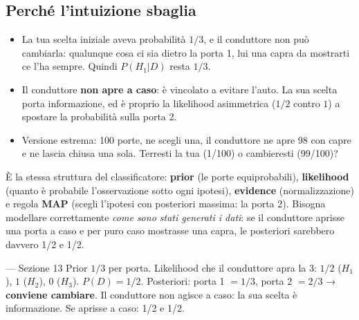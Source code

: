 \subsection{Perché l'intuizione sbaglia}
\begin{intuizione}
\begin{itemize}
  \item La tua scelta iniziale aveva probabilità $1/3$, e il conduttore non può cambiarla: qualunque cosa ci sia dietro la porta 1, lui una capra da mostrarti ce l'ha sempre. Quindi $P(H_1|D)$ resta $1/3$.
  \item Il conduttore \textbf{non apre a caso}: è vincolato a evitare l'auto. La sua scelta porta informazione, ed è proprio la likelihood asimmetrica ($1/2$ contro $1$) a spostare la probabilità sulla porta 2.
  \item Versione estrema: 100 porte, ne scegli una, il conduttore ne apre 98 con capre e ne lascia chiusa una sola. Terresti la tua (1/100) o cambieresti (99/100)?
\end{itemize}
\end{intuizione}
\begin{mlbox}
È la stessa struttura del classificatore: \textbf{prior} (le porte equiprobabili), \textbf{likelihood} (quanto è probabile l'osservazione sotto ogni ipotesi), \textbf{evidence} (normalizzazione) e regola \textbf{MAP} (scegli l'ipotesi con posteriori massima: la porta 2). Bisogna modellare correttamente \emph{come sono stati generati i dati}: se il conduttore aprisse una porta a caso e per puro caso mostrasse una capra, le posteriori sarebbero davvero 1/2 e 1/2.
\end{mlbox}

\begin{appunti}{— Sezione 13}
 Prior $1/3$ per porta. Likelihood che il conduttore apra la 3: $1/2$ ($H_1$), $1$ ($H_2$), $0$ ($H_3$). $P(D)=1/2$. Posteriori: porta 1 $=1/3$, porta 2 $=2/3$ → \textbf{conviene cambiare}. Il conduttore non agisce a caso: la sua scelta è informazione. Se aprisse a caso: 1/2 e 1/2.
\end{appunti}

